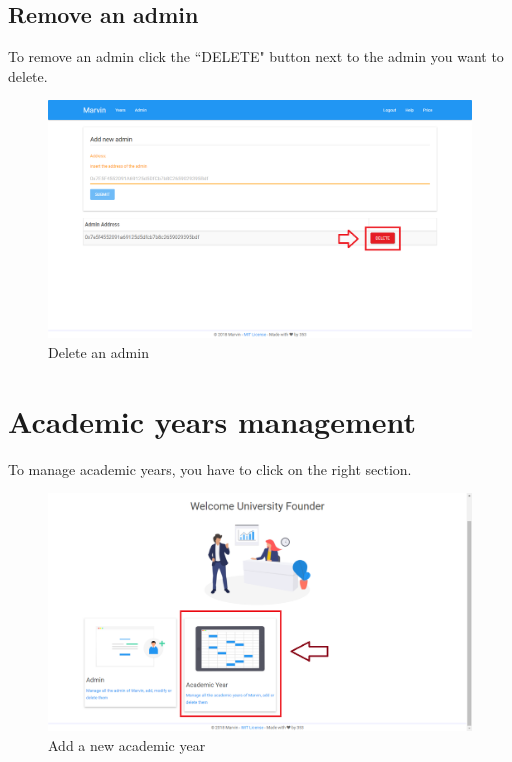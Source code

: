 \documentclass[ManualeUtente]{subfiles}
\begin{document}
	\subsection{Remove an admin}
	To remove an admin click the ``DELETE" button next to the admin you want to delete.
	\begin{figure}[H]
		\centering
		\includegraphics[width=0.7\linewidth]{image/DeleteAdmin}
		\caption[Delete admin]{Delete an admin}
		\label{fig:Delete an admin}
	\end{figure}
	\newpage
	
	\section{Academic years management}
	To manage academic years, you have to click on the right section.
	\begin{figure}[H]
		\centering
		\includegraphics[width=0.7\linewidth]{image/UniAcademicYear}
		\caption[Add year]{Add a new academic year}
		\label{fig:Add a new academic year}
	\end{figure}
\end{document}
